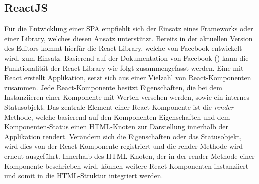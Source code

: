 \subsection{ReactJS}
Für die Entwicklung einer SPA empfiehlt sich der Einsatz eines Frameworks oder einer Library, welches diesen Ansatz unterstützt. Bereits in der aktuellen Version des Editors kommt hierfür die React-Library, welche von Facebook entwickelt wird, zum Einsatz.
Basierend auf der Dokumentation von Facebook (\cite{Facebook:React}) kann die Funktionalität der React-Library wie folgt zusammengefasst werden.
Eine mit React erstellt Applikation, setzt sich aus einer Vielzahl von React-Komponenten zusammen. Jede React-Komponente besitzt Eigenschaften, die bei dem Instanziieren einer Komponente mit Werten versehen werden, sowie ein internes Statusobjekt. Das zentrale Element einer React-Komponente ist die \emph{render}-Methode, welche basierend auf den Komponenten-Eigenschaften und dem Komponenten-Status einen HTML-Knoten zur Darstellung innerhalb der Applikation rendert. Verändern sich die Eigenschaften oder das Statusobjekt, wird dies von der React-Komponente registriert und die render-Methode wird erneut ausgeführt. Innerhalb des HTML-Knoten, der in der render-Methode einer Komponente beschrieben wird, können weitere React-Komponenten instanziiert und somit in die HTML-Struktur integriert werden.

